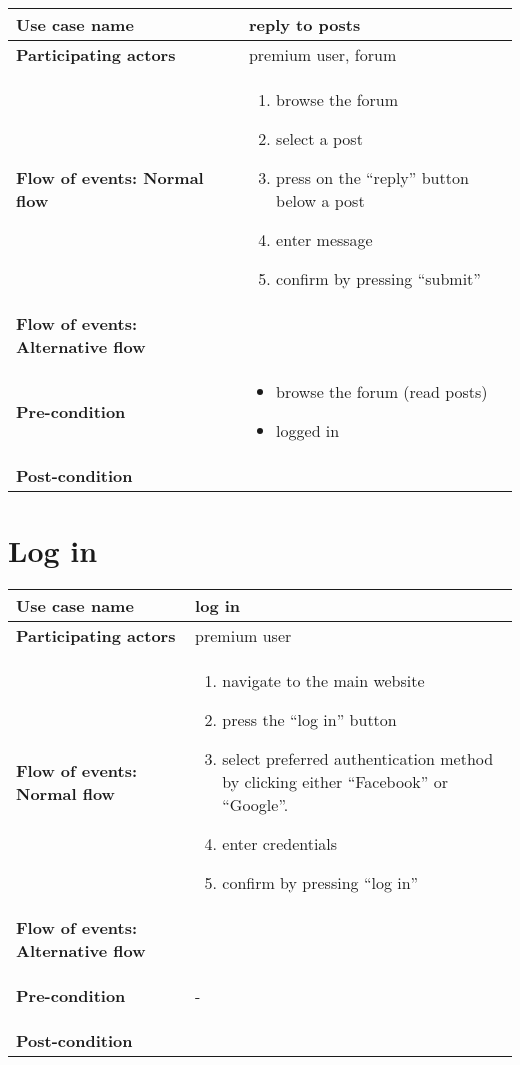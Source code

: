 \documentclass[a4paper, 13pt, draft]{report}
\begin{document}
\begin{center}
	\begin{tabular}{| >{\bf}l | p{5.55cm} |} 
		\hline
		Use case name & reply to posts \\ 
		\hline
		Participating actors & premium user, forum \\
		\hline
		Flow of events: Normal flow & 
		\begin{enumerate}		
			\item browse the forum
			\item select a post
			\item press on the ``reply'' button below a post
			\item enter message
			\item confirm by pressing ``submit''
		\end{enumerate}	\\
		\hline
		Flow of events: Alternative flow & \notapplicable \\
		\hline
		Pre-condition & 
		\begin{itemize} 
			\item browse the forum (read posts)
			\item logged in
		\end{itemize} \\
		\hline
		Post-condition & \notapplicable \\
		\hline
	\end{tabular}
\end{center}

\section*{Log in}

\begin{center}
	\begin{tabular}{| >{\bf}l | p{5.55cm} |} 
		\hline
		Use case name & log in \\ 
		\hline
		Participating actors & premium user \\
		\hline
		Flow of events: Normal flow & 
		\begin{enumerate}		
			\item navigate to the main website
			\item press the ``log in'' button
			\item select preferred authentication method by clicking either ``Facebook'' or ``Google''.
			\item enter credentials
			\item confirm by pressing ``log in''
		\end{enumerate}	\\
		\hline
		Flow of events: Alternative flow & \notapplicable \\
		\hline
		Pre-condition & 
		\begin{itemize} 
				-
		\end{itemize} \\
		\hline
		Post-condition & \notapplicable \\
		\hline
	\end{tabular}
\end{center}
\end{document}
